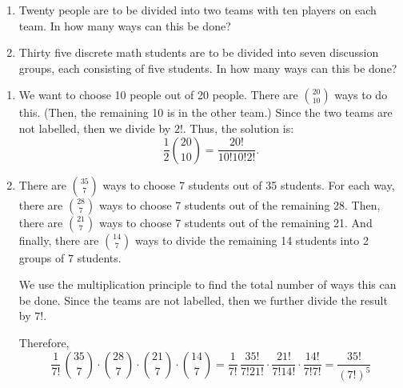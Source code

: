 \documentclass{article}
\theoremstyle{definition}
\begin{document}
\begin{question}
    \begin{enumerate}
        \item Twenty people are to be divided into two teams with ten players on each team.  In how many ways can this be 	
        done?
        \item Thirty five discrete math students are to be divided into seven discussion groups, each consisting of five students.  
        In how many ways can this be done?
    \end{enumerate}
\end{question}
\begin{solution}
    \begin{enumerate}
        \item We want to choose 10 people out of 20 people.  There are $\binom{20}{10}$ ways to do this.  (Then, the remaining 10 is in the other team.) 
        Since the two teams are not labelled, then we divide by $2!$.  Thus, the solution is:
        \[ \frac{1}{2} \binom{20}{10} = \frac{20!}{10!10!2!}. \]
        \item There are $\binom{35}{7}$ ways to choose 7 students out of 35 students.  For each way, there are $\binom{28}{7}$ ways to choose 7 students out of the remaining 28.  Then, there are $\binom{21}{7}$ ways to choose 7 students out of the remaining 21.  And finally, there are $\binom{14}{7}$ ways to divide the remaining 14 students into 2 groups of 7 students.  

We use the multiplication principle to find the total number of ways this can be done.  Since the teams are not labelled, then we further divide the result by $7!$.

Therefore,
\[ 
    \frac{1}{7!} \,\binom{35}{7} \cdot \binom{28}{7} \cdot \binom{21}{7 } \cdot \binom{14}{7} = 
    \frac{1}{7!} \, \frac{35!}{7!21!} \cdot \frac{21!}{7!14!} \cdot \frac{14!}{7!7!}
    = \frac{35!}{(7!)^5}
\]
    \end{enumerate}
\end{solution}
\end{document}
